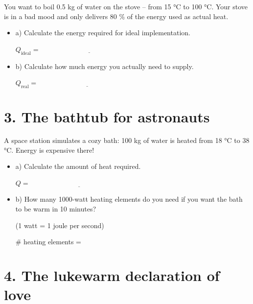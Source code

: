 \documentclass[a4paper]{article}
\begin{document}
	You want to boil 0{.}5 kg of water on the stove – from 15 °C to 100 °C. Your stove is in a bad mood and only delivers 80 \% of the energy used as actual heat.
	
	\begin{itemize}
		\item a) Calculate the energy required for ideal implementation.
		
		\vspace{1em}
		\( Q_\text{ideal} = \underline{\hspace{6cm}} \)
		
		\item b) Calculate how much energy you actually need to supply.
		
		\vspace{1em}
		\( Q_\text{real} = \underline{\hspace{6cm}} \)
	\end{itemize}
	
	\hrulefill
	
	\section*{3. The bathtub for astronauts}
	
	A space station simulates a cozy bath: 100 kg of water is heated from 18 °C to 38 °C. Energy is expensive there!
	
	\begin{itemize}
		\item a) Calculate the amount of heat required.
		
		\vspace{1em}
		\( Q = \underline{\hspace{6cm}} \)
		
		\item b) How many 1000-watt heating elements do you need if you want the bath to be warm in 10 minutes?
		
		(1 watt = 1 joule per second)
		
		\vspace{1em}
		\# heating elements = \underline{\hspace{6cm}}
	\end{itemize}
	
	\hrulefill
	
	\newpage
	
	\section*{4. The lukewarm declaration of love }
	
\end{document}
